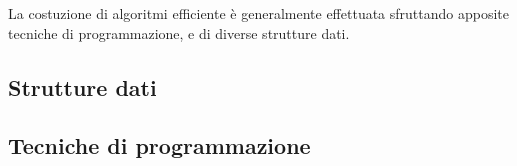 \documentclass{subfiles}
\begin{document}
La costuzione di algoritmi efficiente è generalmente effettuata sfruttando apposite tecniche di programmazione, e di diverse strutture dati.

\subsection{Strutture dati}

\clearpage

\subsection{Tecniche di programmazione}

\end{document}

